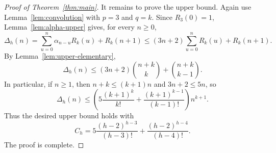 \documentclass[11pt]{amsart}
\theoremstyle{remark}
\theoremstyle{plain}
\begin{document}
\begin{proof}[Proof of Theorem~\ref{thm:main}]
It remains to prove the upper bound. Again use Lemma~\ref{lem:convolution} with $p=3$ and $q=k$. Since $R_3(0)=1$, Lemma~\ref{lem:alpha-upper} gives, for every $n\ge 0$,
\[
\Delta_h(n)=\sum_{u=0}^n \alpha_{n-u}R_k(u)+R_k(n+1)
\le (3n+2)\sum_{u=0}^n R_k(u)+R_k(n+1).
\]
By Lemma~\ref{lem:upper-elementary},
\begin{equation}\label{eq:upper-binomial}
\Delta_h(n)\le (3n+2)\binom{n+k}{k}+\binom{n+k}{k-1}.
\end{equation}
In particular, if $n\ge 1$, then $n+k\le (k+1)n$ and $3n+2\le 5n$, so
\[
\Delta_h(n)\le \left(5\frac{(k+1)^k}{k!}+\frac{(k+1)^{k-1}}{(k-1)!}\right)n^{k+1}.
\]
Thus the desired upper bound holds with
\[
C_h=5\frac{(h-2)^{h-3}}{(h-3)!}+\frac{(h-2)^{h-4}}{(h-4)!}.
\]
The proof is complete.
\end{proof}
\end{document}
